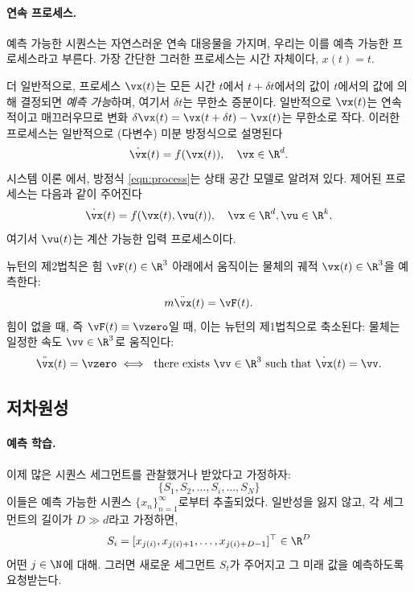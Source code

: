 \documentclass[../../book-main_ko.tex]{subfiles}
\begin{document}
\paragraph{연속 프로세스.}
예측 가능한 시퀀스는 자연스러운 연속 대응물을 가지며, 우리는 이를 예측 가능한 프로세스라고 부른다. 가장 간단한 그러한 프로세스는 시간 자체이다, \(x(t) = t\).

더 일반적으로, 프로세스 \(\vx(t)\)는 모든 시간 \(t\)에서 \(t + \delta t\)에서의 값이 \(t\)에서의 값에 의해 결정되면 \textit{예측 가능}하며, 여기서 \(\delta t\)는 무한소 증분이다. 일반적으로 \(\vx(t)\)는 연속적이고 매끄러우므로 변화 \(\delta \vx(t) = \vx(t + \delta t) - \vx(t)\)는 무한소로 작다. 이러한 프로세스는 일반적으로 (다변수) 미분 방정식으로 설명된다
\begin{equation}
    \dot{\vx}(t) = f(\vx(t)), \quad \vx \in \R^{d}.
    \label{eqn:process}
\end{equation}
시스템 이론 \cite{Cal:Des,Sastry-Nonlinear}에서, 방정식 \eqref{eqn:process}는 상태 공간 모델로 알려져 있다. 제어된 프로세스는 다음과 같이 주어진다
\begin{equation}
    \dot{\vx}(t) = f(\vx(t), \vu(t)), \quad \vx \in \R^{d}, \vu \in \R^{k},
    \label{eqn:process-controlled}
\end{equation}
여기서 \(\vu(t)\)는 계산 가능한 입력 프로세스이다.

\begin{example}
뉴턴의 제2법칙은 힘 \(\vF(t) \in \R^{3}\) 아래에서 움직이는 물체의 궤적 \(\vx(t) \in \R^{3}\)을 예측한다:
\begin{equation}
    m\ddot{\vx}(t) = \vF(t).
    \label{eqn:newton-second}
\end{equation}
힘이 없을 때, 즉 \(\vF(t) \equiv \vzero\)일 때, 이는 뉴턴의 제1법칙으로 축소된다: 물체는 일정한 속도 \(\vv \in \R^{3}\)로 움직인다:
\begin{equation}
    \ddot{\vx}(t) = \vzero \iff \ \text{there exists } \vv \in \R^{3} \text{ such that } \dot{\vx}(t) = \vv.
    \label{eqn:newton-first}
\end{equation}
\end{example}


\subsection{저차원성}\label{sec:intro-low-dimensionality}
\paragraph{예측 학습.}
이제 많은 시퀀스 세그먼트를 관찰했거나 받았다고 가정하자:
\begin{equation}
    \{S_{1}, S_{2}, \ldots, S_{i}, \ldots, S_{N}\}
\end{equation}
이들은 예측 가능한 시퀀스 \(\{x_{n}\}_{n=1}^{\infty}\)로부터 추출되었다. 일반성을 잃지 않고, 각 세그먼트의 길이가 \(D \gg d\)라고 가정하면,
\begin{equation}
    S_{i} = [x_{j(i)}, x_{j(i)+1}, \ldots, x_{j(i)+D-1}]^{\top} \in \R^{D}
\end{equation}
어떤 \(j \in \N\)에 대해. 그러면 새로운 세그먼트 \(S_{t}\)가 주어지고 그 미래 값을 예측하도록 요청받는다.
\end{document}
